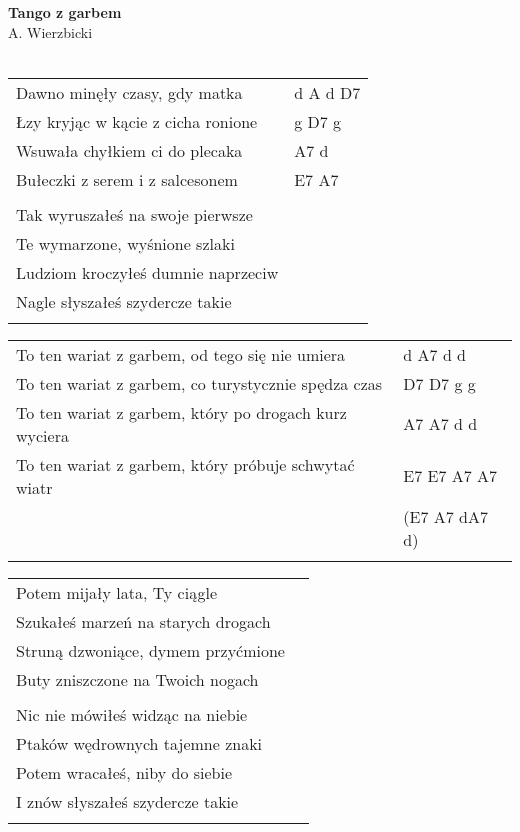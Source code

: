 \documentclass[a5paper]{article}
\begin{document}


\noindent
\fontsize{12pt}{15pt}\selectfont
\textbf{Tango z garbem} \\
\fontsize{8pt}{10pt}\selectfont
A. Wierzbicki \\ \\
\fontsize{10pt}{12pt}\selectfont
{}
\begin{tabular}{@{}p{9.5cm}p{3cm}@{}}
\noindent
Dawno minęły czasy, gdy matka & d A d D7 \\
Łzy kryjąc w kącie z cicha ronione & g D7 g \\
Wsuwała chyłkiem ci do plecaka & A7 d \\
Bułeczki z serem i z salcesonem & E7 A7 \\ \\
 
Tak wyruszałeś na swoje pierwsze \\
Te wymarzone, wyśnione szlaki \\
Ludziom kroczyłeś dumnie naprzeciw \\
Nagle słyszałeś szydercze takie \\ \\
\end{tabular}

\noindent
\begin{tabular}{@{}p{8.5cm}p{3cm}@{}}
To ten wariat z garbem, od tego się nie umiera & d A7 d d \\
To ten wariat z garbem, co turystycznie spędza czas & D7 D7 g g \\
To ten wariat z garbem, który po drogach kurz wyciera & A7 A7 d d \\
To ten wariat z garbem, który próbuje schwytać wiatr & E7 E7 A7 A7 \\
& (E7 A7 dA7 d) \\ \\
\end{tabular}

\noindent
\begin{tabular}{@{}p{8.5cm}p{3cm}@{}}
Potem mijały lata, Ty ciągle \\
Szukałeś marzeń na starych drogach \\
Struną dzwoniące, dymem przyćmione \\
Buty zniszczone na Twoich nogach \\ \\
 
Nic nie mówiłeś widząc na niebie\\
Ptaków wędrownych tajemne znaki\\
Potem wracałeś, niby do siebie\\
I znów słyszałeś szydercze takie\\\\
\end{tabular}
\end{document}
